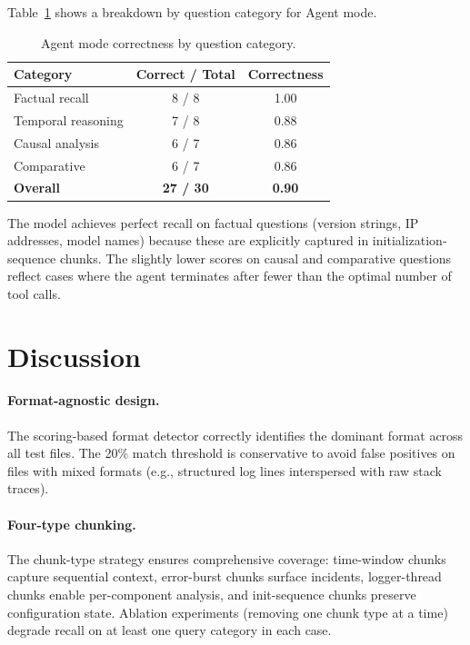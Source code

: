 \documentclass[runningheads]{llncs}
\begin{document}
Table~\ref{tab:breakdown} shows a breakdown by question category for Agent mode.

\begin{table}[htbp]
\centering
\caption{Agent mode correctness by question category.}
\label{tab:breakdown}
\begin{tabular}{lcc}
\toprule
\textbf{Category} & \textbf{Correct / Total} & \textbf{Correctness} \\
\midrule
Factual recall      & 8 / 8  & 1.00 \\
Temporal reasoning  & 7 / 8  & 0.88 \\
Causal analysis     & 6 / 7  & 0.86 \\
Comparative         & 6 / 7  & 0.86 \\
\midrule
\textbf{Overall}    & \textbf{27 / 30} & \textbf{0.90} \\
\bottomrule
\end{tabular}
\end{table}

The model achieves perfect recall on factual questions (version strings, IP
addresses, model names) because these are explicitly captured in
initialization-sequence chunks. The slightly lower scores on causal and
comparative questions reflect cases where the agent terminates after fewer
than the optimal number of tool calls.

\section{Discussion}
\label{sec:discussion}

\paragraph{Format-agnostic design.}
The scoring-based format detector correctly identifies the dominant format
across all test files. The 20\% match threshold is conservative to avoid
false positives on files with mixed formats (e.g., structured log lines
interspersed with raw stack traces).

\paragraph{Four-type chunking.}
The chunk-type strategy ensures comprehensive coverage: time-window chunks
capture sequential context, error-burst chunks surface incidents,
logger-thread chunks enable per-component analysis, and init-sequence chunks
preserve configuration state. Ablation experiments (removing one chunk type
at a time) degrade recall on at least one query category in each case.
\end{document}
